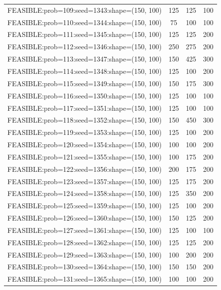 \begin{longtable}{lccc}
FEASIBLE:prob=109:seed=1343:shape=(150, 100) &      125 &   125 &    100 \\
FEASIBLE:prob=110:seed=1344:shape=(150, 100) &       75 &   100 &    100 \\
FEASIBLE:prob=111:seed=1345:shape=(150, 100) &      125 &   125 &    200 \\
FEASIBLE:prob=112:seed=1346:shape=(150, 100) &      250 &   275 &    200 \\
FEASIBLE:prob=113:seed=1347:shape=(150, 100) &      150 &   425 &    300 \\
FEASIBLE:prob=114:seed=1348:shape=(150, 100) &      125 &   100 &    200 \\
FEASIBLE:prob=115:seed=1349:shape=(150, 100) &      150 &   175 &    300 \\
FEASIBLE:prob=116:seed=1350:shape=(150, 100) &      125 &   100 &    100 \\
FEASIBLE:prob=117:seed=1351:shape=(150, 100) &      125 &   100 &    100 \\
FEASIBLE:prob=118:seed=1352:shape=(150, 100) &      150 &   450 &    300 \\
FEASIBLE:prob=119:seed=1353:shape=(150, 100) &      125 &   100 &    200 \\
FEASIBLE:prob=120:seed=1354:shape=(150, 100) &      100 &   100 &    200 \\
FEASIBLE:prob=121:seed=1355:shape=(150, 100) &      100 &   175 &    200 \\
FEASIBLE:prob=122:seed=1356:shape=(150, 100) &      200 &   175 &    200 \\
FEASIBLE:prob=123:seed=1357:shape=(150, 100) &      125 &   175 &    200 \\
FEASIBLE:prob=124:seed=1358:shape=(150, 100) &      125 &   350 &    200 \\
FEASIBLE:prob=125:seed=1359:shape=(150, 100) &      125 &   100 &    200 \\
FEASIBLE:prob=126:seed=1360:shape=(150, 100) &      150 &   125 &    200 \\
FEASIBLE:prob=127:seed=1361:shape=(150, 100) &      125 &   100 &    100 \\
FEASIBLE:prob=128:seed=1362:shape=(150, 100) &      125 &   125 &    200 \\
FEASIBLE:prob=129:seed=1363:shape=(150, 100) &      100 &   200 &    200 \\
FEASIBLE:prob=130:seed=1364:shape=(150, 100) &      150 &   150 &    200 \\
FEASIBLE:prob=131:seed=1365:shape=(150, 100) &      100 &   100 &    200 \\

\end{longtable}
